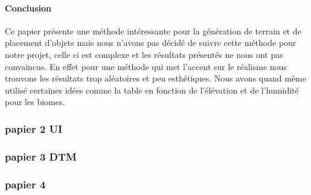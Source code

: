     \paragraph{Conclusion} Ce papier présente une méthode intéressante pour la génération de terrain et de placement d'objets mais nous n'avons pas décidé de suivre cette méthode pour notre projet, celle ci est complexe et les résultats présentés ne nous ont pas convaincus. En effet pour une méthode qui met l'accent sur le réalisme nous trouvons les résultats trop aléatoires et peu esthétiques.
    Nous avons quand même utilisé certaines idées comme la table en fonction de l'élévation et de l'humidité pour les biomes.



    
        \subsubsection{papier 2 UI \cite{UIpaper}}

        \subsubsection{papier 3 DTM \cite{DTMpaper}}
        \subsubsection{papier 4}